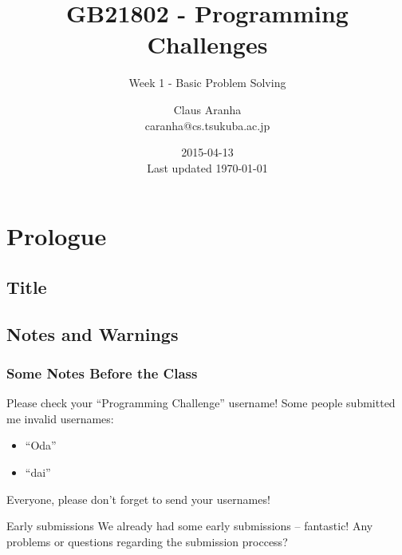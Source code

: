 \documentclass{beamer}
\title[GB21802]{GB21802 - Programming Challenges}
\subtitle[]{Week 1 - Basic Problem Solving}
\author[Claus Aranha]{Claus Aranha\\{\footnotesize caranha@cs.tsukuba.ac.jp}}
\institute{College of Information Science}
\date{2015-04-13\\{\tiny Last updated \today}}
\begin{document}
\section{Prologue}
\subsection{Title}
\begin{frame}
\maketitle
\end{frame}

\subsection{Notes and Warnings}

\begin{frame}
  \frametitle{Some Notes Before the Class}
  \begin{exampleblock}{Please check your ``Programming Challenge'' username!}
    Some people submitted me invalid usernames:
    \begin{itemize}
    \item ``Oda''
    \item ``dai''
    \end{itemize}
    Everyone, please don't forget to send your usernames!
  \end{exampleblock}
  \vfill
  \begin{exampleblock}{Early submissions}
    We already had some early submissions -- fantastic!
    \medskip
    Any problems or questions regarding the submission proccess?
  \end{exampleblock}
\end{frame}
\end{document}
